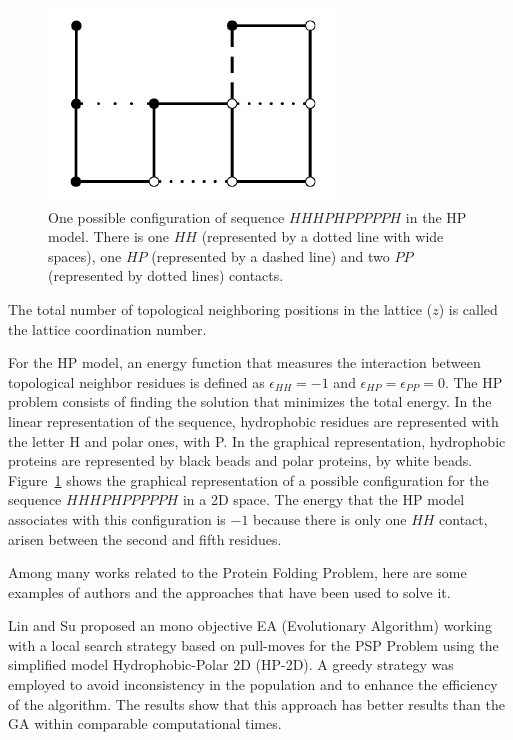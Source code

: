 \begin{figure}[htb!] \label{fig:PROTEXAM}
	\centering
	\includegraphics[scale=0.7]{figures/protein_example.png}
	\caption{One possible configuration of  sequence $HHHPHPPPPPH$ in the HP model. There is one $HH$ (represented by a dotted line with wide spaces), one $HP$ (represented by a dashed line) and  two $PP$  (represented by dotted lines) contacts.}
\end{figure}


The total number of topological neighboring positions in the lattice ($z$) is called the lattice coordination number.


For the HP model, an energy function that  measures the interaction between topological  neighbor residues is defined  as  $\epsilon_{HH}=-1$ and $\epsilon_{HP}=\epsilon_{PP}=0$. The HP problem consists of finding the solution that minimizes the total energy. In the linear representation of the sequence, hydrophobic residues are represented with the letter H and polar ones, with P. In the graphical representation, hydrophobic proteins are represented  by black beads and polar proteins, by white beads. Figure~\ref{fig:PROTEXAM} shows the graphical representation of a possible configuration for  the sequence  $HHHPHPPPPPH$ in a 2D space. The energy that the HP model associates with this configuration is $-1$ because there is only one $HH$ contact, arisen between the second and fifth residues.


Among many works related to the Protein Folding Problem, here are some examples of authors and the approaches that have been used to solve it.


Lin and Su \cite{li2012genetic} proposed an mono objective EA (Evolutionary Algorithm) working with a local search strategy based on pull-moves for the PSP Problem using the simplified model Hydrophobic-Polar 2D (HP-2D). A greedy strategy was employed to avoid inconsistency in the population and to enhance the efficiency of the algorithm. The results show that this approach has better results than the GA within comparable computational times.


